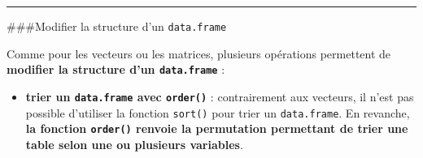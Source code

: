 \documentclass[12pt,twosided, notitlepage]{book}
\newenvironment{Shaded}{}{}
\newcommand{\CommentTok}[1]{\textcolor[rgb]{0.00,0.50,0.00}{#1}}
\newcommand{\KeywordTok}[1]{\textcolor[rgb]{0.00,0.00,1.00}{#1}}
\newcommand{\NormalTok}[1]{#1}
\newcommand{\OperatorTok}[1]{#1}
\providecommand{\tightlist}{%
  \setlength{\itemsep}{0pt}\setlength{\parskip}{0pt}}
\renewenvironment{Shaded}{\begin{snugshade}}{\end{snugshade}}
\begin{document}
\begin{enumerate}
\begin{enumerate}
\begin{Shaded}
\end{Shaded}

    \begin{center} \rule{0.5\linewidth}{\linethickness}\end{center} 
     \bigskip 
     \fi
  \end{enumerate}
\end{enumerate}

\#\#\#Modifier la structure d'un \texttt{data.frame}

Comme pour les vecteurs ou les matrices, plusieurs opérations permettent
de \textbf{modifier la structure d'un \texttt{data.frame}} :

\begin{itemize}
\tightlist
\item
  \textbf{trier un \texttt{data.frame} avec
  \texttt{order()}} : contrairement aux
  vecteurs, il n'est pas possible d'utiliser la fonction \texttt{sort()}
  pour trier un \texttt{data.frame}. En revanche, \textbf{la fonction
  \texttt{order()} renvoie la permutation permettant de trier une table
  selon une ou plusieurs variables}.
\end{itemize}
\end{document}
